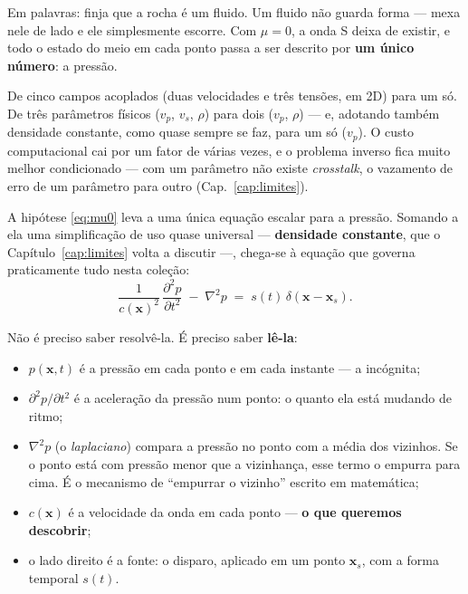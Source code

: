 \documentclass[11pt,a4paper,oneside]{report}
\begin{document}
Em palavras: finja que a rocha \'e um fluido. Um fluido n\~ao guarda forma ---
mexa nele de lado e ele simplesmente escorre. Com $\mu=0$, a onda S deixa de
existir, e todo o estado do meio em cada ponto passa a ser descrito por
\textbf{um \'unico n\'umero}: a press\~ao.

\begin{teoria}
De cinco campos acoplados (duas velocidades e tr\^es tens\~oes, em 2D) para
um s\'o. De tr\^es par\^ametros f\'isicos ($v_p$, $v_s$, $\rho$) para dois
($v_p$, $\rho$) --- e, adotando tamb\'em densidade constante, como quase sempre
se faz, para um s\'o ($v_p$). O custo computacional cai por um fator de
v\'arias vezes, e o problema inverso fica muito melhor condicionado --- com
um par\^ametro n\~ao existe \emph{crosstalk}, o vazamento de erro de um
par\^ametro para outro (Cap.~\ref{cap:limites}).
\end{teoria}

A hip\'otese \eqref{eq:mu0} leva a uma \'unica equa\c{c}\~ao escalar para a
press\~ao. Somando a ela uma simplifica\c{c}\~ao de uso quase universal ---
\textbf{densidade constante}, que o Cap\'itulo~\ref{cap:limites} volta a
discutir ---, chega-se \`a equa\c{c}\~ao que governa praticamente tudo nesta
cole\c{c}\~ao:
\begin{equation}
\frac{1}{c(\mathbf{x})^{2}}\,\frac{\partial^{2}p}{\partial t^{2}}
 \;-\; \nabla^{2}p \;=\; s(t)\,\delta(\mathbf{x}-\mathbf{x}_s).
\label{eq:acustica1}
\end{equation}

N\~ao \'e preciso saber resolv\^e-la. \'E preciso saber \textbf{l\^e-la}:

\begin{itemize}[leftmargin=*]
\item $p(\mathbf{x},t)$ \'e a press\~ao em cada ponto e em cada instante ---
a inc\'ognita;
\item $\partial^{2}p/\partial t^{2}$ \'e a acelera\c{c}\~ao da press\~ao num
ponto: o quanto ela est\'a mudando de ritmo;
\item $\nabla^{2}p$ (o \emph{laplaciano}) compara a press\~ao no ponto com a
m\'edia dos vizinhos. Se o ponto est\'a com press\~ao menor que a
vizinhan\c{c}a, esse termo o empurra para cima. \'E o mecanismo de
``empurrar o vizinho'' escrito em matem\'atica;
\item $c(\mathbf{x})$ \'e a velocidade da onda em cada ponto --- \textbf{o que
queremos descobrir};
\item o lado direito \'e a fonte: o disparo, aplicado em um ponto
$\mathbf{x}_s$, com a forma temporal $s(t)$.
\end{itemize}
\end{document}
